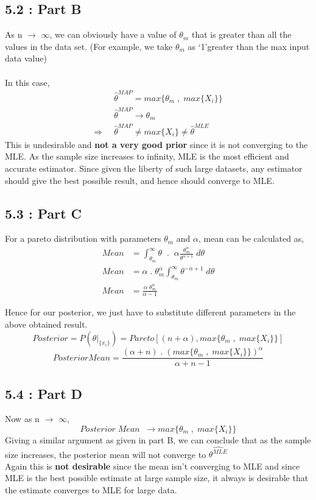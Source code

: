 \documentclass[12pt, a4paper]{article}
\begin{document}
\newpage
\subsection*{5.2 : Part B}
As n $\rightarrow$ $\infty$, we can obviously have a value of $\theta_m$ that is greater than all the values in the data set. (For example, we take $\theta_m$ as \lq 1\rq greater than the max input data value) \\ \\ 
In this case, 
\begin{align*}
&\hat{\theta}^{MAP} = max\{\theta_m \; , \; max\{X_i\}\} \\
&\hat{\theta}^{MAP} \rightarrow \theta_m \\
\Longrightarrow \;\; &\hat{\theta}^{MAP} \neq max\{X_i\} \neq \hat{\theta}^{MLE}
\end{align*}
This is undesirable and \textbf{not a very good prior} since it is not converging to the MLE. As the sample size increases to infinity, MLE is the most efficient and accurate estimator. Since given the liberty of such large datasets, any estimator should give the best possible result, and hence should converge to MLE.

\subsection*{5.3 : Part C}
For a pareto distribution with parameters $\theta_m$ and $\alpha$, mean can be calculated as, \\
\begin{align*}
Mean &= \int_{\theta_m}^\infty\theta \;\; . \;\; \alpha \frac{\theta^\alpha_m}{\theta^{\alpha + 1}} \; d\theta \\
Mean &= \alpha \; .\; \theta^\alpha_m \int_{\theta_m}^\infty \theta^{-\alpha + 1} \; d\theta \\
Mean &= \frac{\alpha \; \theta^\alpha_m}{\alpha - 1}
\end{align*}

Hence for our posterior, we just have to substitute different parameters in the above obtained result.
$$
Posterior = P(\theta|_{\{x_i\}}) = Pareto[(n+\alpha), max\{\theta_m \; , \; max\{X_i\}\}]
$$
$$
\boxed{Posterior Mean = \frac{(\alpha + n) \; . \; (max\{\theta_m \; , \; max\{X_i\}\})^\alpha}{\alpha + n - 1}}
$$

\subsection*{5.4 : Part D}
Now as n $\rightarrow$ $\infty$, 
$$
Posterior \; Mean \;\; \rightarrow max\{\theta_m \; , \; max\{X_i\}\}
$$
Giving a similar argument as given in part B, we can conclude that as the sample size increases, the posterior mean will not converge to $\hat{\theta^{MLE}}$ \\ 
Again this is \textbf{not desirable} since the mean isn't converging to MLE and since MLE is the best possible estimate at large sample size, it always is desirable that the estimate converges to MLE for large data.
\end{document}
